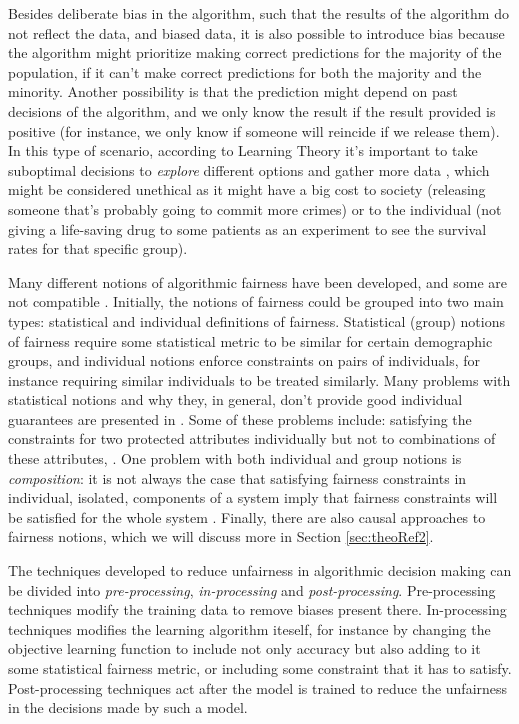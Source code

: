 Besides deliberate bias in the algorithm, such that the results of the algorithm do not reflect the data, and biased data, it is also possible to introduce bias because the algorithm might prioritize making correct predictions for the majority of the population, if it can't make correct predictions for both the majority and the minority. Another possibility is that the prediction might depend on past decisions of the algorithm, and we only know the result if the result provided is positive (for instance, we only know if someone will reincide if we release them). In this type of scenario, according to Learning Theory it's important to take suboptimal decisions to \textit{explore} different options and gather more data \cite{The Frontiers of Fairness in Machine Learning}, which might be considered unethical as it might have a big cost to society (releasing someone that's probably going to commit more crimes) or to the individual (not giving a life-saving drug to some patients as an experiment to see the survival rates for that specific group). 

Many different notions of algorithmic fairness have been developed, and some are not compatible \cite{uncompatibleFair}. Initially, the notions of fairness could be grouped into two main types: statistical and individual definitions of fairness\cite{The Frontiers of Fairness in Machine Learning}. Statistical (group) notions of fairness require some statistical metric to be similar for certain demographic groups, and individual notions enforce constraints on pairs of individuals, for instance requiring similar individuals to be treated similarly. Many problems with statistical notions and why they, in general, don't provide good individual guarantees are presented in \cite{awareness}\cite{Preventing Fairness Gerrymandering:Auditing and Learning for Subgroup Fairness}. Some of these problems include: satisfying the constraints for two protected attributes individually but not to combinations of these attributes, . One problem with both individual and group notions is \textit{composition}: it is not always the case that satisfying fairness constraints in individual, isolated, components of a system imply that fairness constraints will be satisfied for the whole system \cite{Fairness Under Composition}. Finally, there are also causal approaches to fairness notions, which we will discuss more in Section \ref{sec:theoRef2}.

The techniques developed to reduce unfairness in algorithmic decision making can be divided into \textit{pre-processing}, \textit{in-processing} and \textit{post-processing}. Pre-processing techniques modify the training data to remove biases present there. In-processing techniques modifies the learning algorithm iteself, for instance by changing the objective learning function to include not only accuracy but also adding to it some statistical fairness metric, or including some constraint that it has to satisfy. Post-processing techniques act after the model is trained to reduce the unfairness in the decisions made by such a model.

